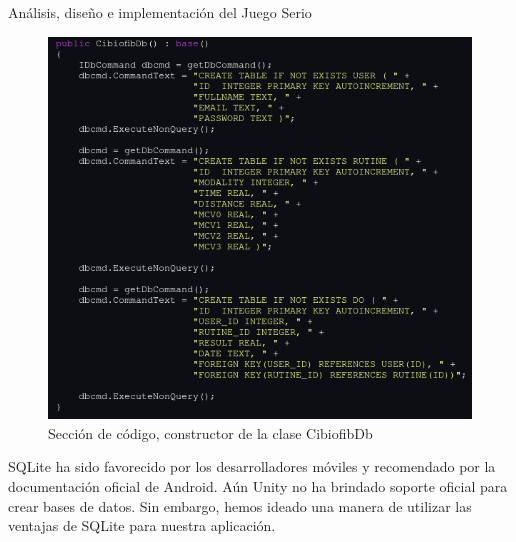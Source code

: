 \begin{thesischapter}{2} {Análisis, diseño e implementación del Juego Serio}
    \begin{figure}[ht]
        \centering
        \includegraphics[scale=0.5]{images/database-code.png}
        \caption{Sección de código, constructor de la clase CibiofibDb}
        \label{fig: database-code}
    \end{figure}
    
    \vspace{10pt}
    SQLite ha sido favorecido por los desarrolladores móviles y recomendado por la documentación oficial de Android. Aún  
    Unity no ha brindado soporte oficial para crear bases de datos. Sin embargo, hemos ideado una manera de utilizar las 
    ventajas de SQLite para nuestra aplicación. 
    

\end{thesischapter}
